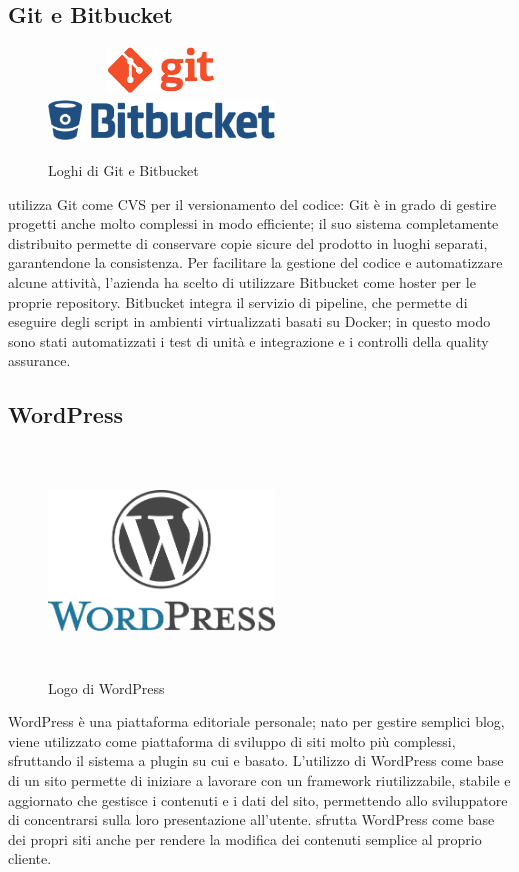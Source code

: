 \subsection{Git e Bitbucket}
\begin{figure}[htbp]
   \centering
   {\includegraphics[width=6cm,height=1.2cm,keepaspectratio]{immagini/git-logo} }
   \qquad
   {\includegraphics[width=6cm,height=1.2cm,keepaspectratio]{immagini/bitbucket-logo} }
   \caption{Loghi di Git e Bitbucket}
\end{figure}
\nomeAzienda{} utilizza Git come CVS per il versionamento del codice: Git è in grado di gestire progetti anche molto complessi in modo efficiente; il suo sistema completamente distribuito permette di conservare copie sicure del prodotto in luoghi separati, garantendone la consistenza. Per facilitare la gestione del codice e automatizzare alcune attività, l'azienda ha scelto di utilizzare Bitbucket come hoster per le proprie repository. Bitbucket integra il servizio di pipeline, che permette di eseguire degli script in ambienti virtualizzati basati su Docker; in questo modo sono stati automatizzati i test di unità e integrazione e i controlli della quality assurance.

\subsection{WordPress}
\begin{figure}[htbp]
   \begin{center}
      \includegraphics[width=6cm,height=6cm,keepaspectratio]{immagini/wordpress-logo}
   \end{center}
   \caption{Logo di WordPress}
\end{figure}
WordPress è una piattaforma editoriale personale; nato per gestire semplici blog, viene utilizzato come piattaforma di sviluppo di siti molto più complessi, sfruttando il sistema a plugin su cui e basato. L'utilizzo di WordPress come base di un sito permette di iniziare a lavorare con un framework riutilizzabile, stabile e aggiornato che gestisce i contenuti e i dati del sito, permettendo allo sviluppatore di concentrarsi sulla loro presentazione all'utente.
\nomeAzienda{} sfrutta WordPress come base dei propri siti anche per rendere la modifica dei contenuti semplice al proprio cliente.

